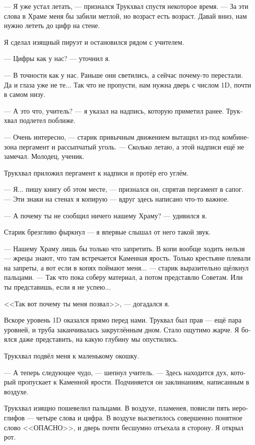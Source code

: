 \documentclass[a4paper,12pt,fleqn]{book}\usepackage{cooltooltips}\usepackage{polyglossia}\setdefaultlanguage[babelshorthands=true]{russian}\setotherlanguage{english}\defaultfontfeatures{Ligatures=TeX,Mapping=tex-text} \usepackage{xcolor}\definecolor{lightgray}{HTML}{bbbbbb}\color{lightgray}\newcommand{\ml}[3]{\textenglish{\textcolor{black}{#3}}}
\newcommand{\asterism}{\vspace{1em}{\centering\Large\bfseries$\ast~\ast~\ast$\par}\vspace{1em}}
\begin{document}
{\asterism

--- Я уже устал летать, --- признался Трукхвал спустя некоторое время.
--- За эти слова в Храме меня бы забили метлой, но возраст есть возраст.
Давай вниз, нам нужно лететь до цифр на стене.

Я сделал изящный пируэт и остановился рядом с учителем.

--- Цифры как у нас? --- уточнил я.

--- В точности как у нас.
Раньше они светились, а сейчас почему-то перестали.
Да и глаза уже не те...
Так что не пропусти, нам нужна дверь с числом 1D, почти в самом низу.

--- А это что, учитель? --- я указал на надпись, которую приметил ранее.
Трукхвал подлетел поближе.

--- Очень интересно, --- старик привычным движением вытащил из-под комбинезона пергамент и рассыпчатый уголь.
--- Сколько летаю, а этой надписи ещё не замечал.
Молодец, ученик.

Трукхвал приложил пергамент к надписи и протёр его углём.

--- Я... пишу книгу об этом месте, --- признался он, спрятав пергамент в сапог.
--- Эти знаки на стенах я копирую --- вдруг здесь написано что-то важное.

--- А почему ты не сообщил ничего нашему Храму? --- удивился я.

Старик брезгливо фыркнул --- я впервые слышал от него такой звук.

--- Нашему Храму лишь бы только что запретить.
В копи вообще ходить нельзя --- жрецы знают, что там встречается Каменная ярость.
Только крестьяне плевали на запреты, а вот если в копях поймают меня... --- старик выразительно щёлкнул пальцами.
--- Так что пока соберу материал, а потом представлю Советам.
Или ты представишь, если я не успею...

<<Так вот почему ты меня позвал>>, --- догадался я.

\asterism

Вскоре уровень 1D оказался прямо перед нами.
Труквал был прав --- ещё пара уровней, и труба заканчивалась закруглённым дном.
Стало ощутимо жарче.
Я боялся даже представить, на какую глубину мы опустились.

Трукхвал подвёл меня к маленькому окошку.

--- А теперь следующее чудо, --- шепнул учитель.
--- Здесь находится дух, который пропускает к Каменной ярости.
Подчиняется он заклинаниям, написанным в воздухе.

Трукхвал изящно пошевелил пальцами.
В воздухе, пламенея, повисли пять иероглифов --- четыре слова и цифра.
В воздухе высветилось совершенно понятное слово <<ОПАСНО>>, и дверь почти бесшумно отъехала в сторону.
Я открыл рот.

}
\end{document}
